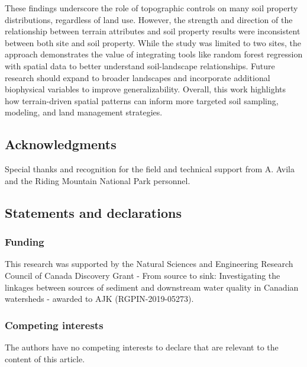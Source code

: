 \documentclass[
  number]{elsarticle}
\begin{document}
These findings underscore the role of topographic controls on many soil
property distributions, regardless of land use. However, the strength
and direction of the relationship between terrain attributes and soil
property results were inconsistent between both site and soil property.
While the study was limited to two sites, the approach demonstrates the
value of integrating tools like random forest regression with spatial
data to better understand soil-landscape relationships. Future research
should expand to broader landscapes and incorporate additional
biophysical variables to improve generalizability. Overall, this work
highlights how terrain-driven spatial patterns can inform more targeted
soil sampling, modeling, and land management strategies.

\subsection*{Acknowledgments}\label{acknowledgments}

Special thanks and recognition for the field and technical support from
A. Avila and the Riding Mountain National Park personnel.

\subsection*{Statements and
declarations}\label{statements-and-declarations}

\subsubsection*{Funding}\label{funding}

This research was supported by the Natural Sciences and Engineering
Research Council of Canada Discovery Grant - From source to sink:
Investigating the linkages between sources of sediment and downstream
water quality in Canadian watersheds - awarded to AJK
(RGPIN-2019-05273).

\subsubsection*{Competing interests}\label{competing-interests}

The authors have no competing interests to declare that are relevant to
the content of this article.
\end{document}
